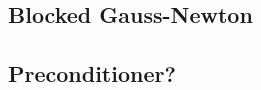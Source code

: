 \subsection{Blocked Gauss-Newton} %
\label{sub:blockedjtj}


\subsection{Preconditioner?} %
\label{sub:preconditioner}

